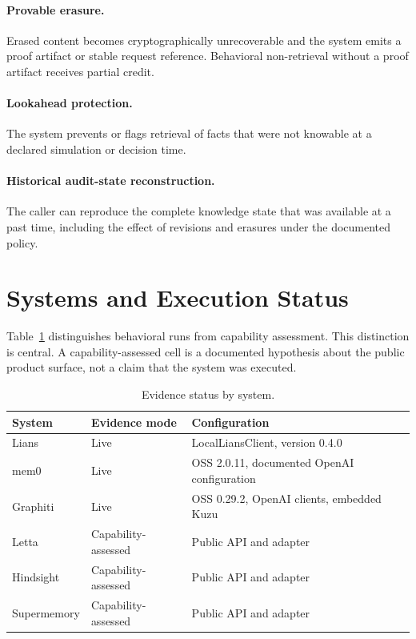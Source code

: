 \documentclass[10pt]{article}
\begin{document}
\paragraph{Provable erasure.}
Erased content becomes cryptographically unrecoverable and the system emits a proof
artifact or stable request reference. Behavioral non-retrieval without a proof
artifact receives partial credit.

\paragraph{Lookahead protection.}
The system prevents or flags retrieval of facts that were not knowable at a declared
simulation or decision time.

\paragraph{Historical audit-state reconstruction.}
The caller can reproduce the complete knowledge state that was available at a past
time, including the effect of revisions and erasures under the documented policy.

\section{Systems and Execution Status}

Table~\ref{tab:status} distinguishes behavioral runs from capability assessment. This
distinction is central. A capability-assessed cell is a documented hypothesis about
the public product surface, not a claim that the system was executed.

\begin{table}[h]
\centering
\caption{Evidence status by system.}
\label{tab:status}
\begin{tabular}{lll}
\toprule
System & Evidence mode & Configuration \\
\midrule
Lians & Live & LocalLiansClient, version 0.4.0 \\
mem0 & Live & OSS 2.0.11, documented OpenAI configuration \\
Graphiti & Live & OSS 0.29.2, OpenAI clients, embedded Kuzu \\
Letta & Capability-assessed & Public API and adapter \\
Hindsight & Capability-assessed & Public API and adapter \\
Supermemory & Capability-assessed & Public API and adapter \\
\bottomrule
\end{tabular}
\end{table}
\end{document}
